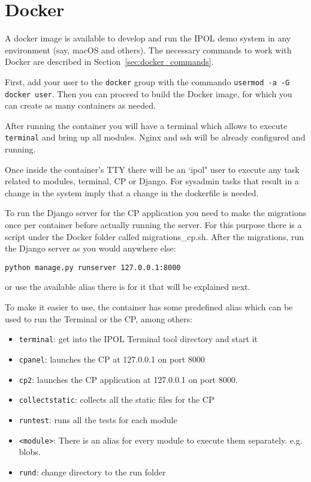 \documentclass[a4paper,12pt]{article}
\begin{document}
\section{Docker}
A docker image is available to develop and run the IPOL demo system in any environment (say, macOS and others).
The necessary commands to work with Docker are described in Section~\ref{sec:docker_commands}.

First, add your user to the {\tt docker} group with the commando {\tt usermod -a -G docker user}.
Then you can proceed to build the Docker image, for which you can create as many containers as needed.

After running the container you will have a terminal which allows to execute {\tt terminal} and bring up all modules. Nginx and ssh will be already
configured and running.

Once inside the container's TTY there will be an `ipol" user to execute any task related to modules, terminal, 
CP or Django. For sysadmin tasks that result in a change in the system imply that a change in the dockerfile is needed.
 
To run the Django server for the CP application you need to make the migrations once per
container before actually running the server. For this purpose there is a script under the Docker folder called migrations\_cp.sh.
After the migrations, run the Django server as you would anywhere else:

{\tt python manage.py runserver 127.0.0.1:8000}

or use the available  alias there is for it that will be explained next.
 
To make it easier to use, the container has some predefined alias which can be used to run the Terminal or the CP, among others:
 \begin{itemize}
 	\item {\tt terminal}: get into the IPOL Terminal tool directory and start it
 	\item {\tt cpanel}: launches the CP at 127.0.0.1 on port 8000
 	\item {\tt cp2}: launches the CP application at 127.0.0.1 on port 8000.
 	\item {\tt collectstatic}: collects all the static files for the CP
 	\item {\tt runtest}: runs all the tests for each module
 	\item {\tt<module>}: There is an alias for every module to execute them separately. e.g. blobs.
 	\item {\tt rund}: change directory to the run folder
 \end{itemize}
\end{document}
